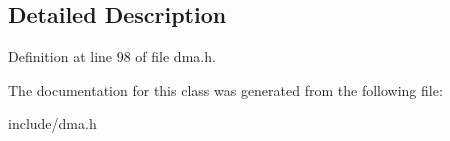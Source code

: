 \subsection{Detailed Description}


Definition at line 98 of file dma.\-h.



The documentation for this class was generated from the following file\-:\begin{DoxyCompactItemize}
\item 
include/dma.\-h\end{DoxyCompactItemize}
